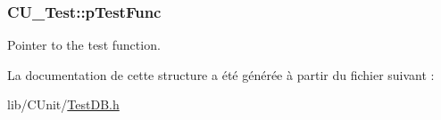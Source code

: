 \hypertarget{structCU__Test_a9543ec07c51ec70a40cdd845ce3bf55b}{
\subsubsection[{p\-Test\-Func}]{ C\-U\-\_\-\-Test\-::p\-Test\-Func}}\label{structCU__Test_a9543ec07c51ec70a40cdd845ce3bf55b}


Pointer to the test function. 



La documentation de cette structure a été générée à partir du fichier suivant \-:\begin{DoxyCompactItemize}
\item 
lib/\-C\-Unit/\hyperlink{TestDB_8h}{Test\-D\-B.\-h}\end{DoxyCompactItemize}
